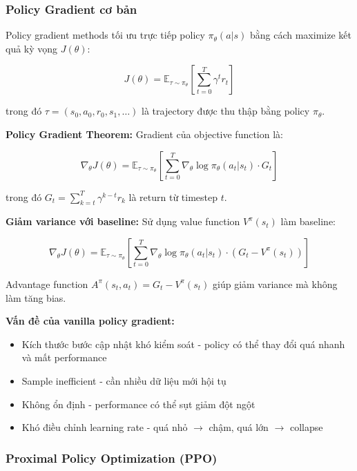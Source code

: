 \subsubsection{Policy Gradient cơ bản}

Policy gradient methods tối ưu trực tiếp policy $\pi_\theta(a|s)$ bằng cách maximize kết quả kỳ vọng $J(\theta)$:

\begin{equation}
J(\theta) = \mathbb{E}_{\tau \sim \pi_\theta} \left[ \sum_{t=0}^T \gamma^t r_t \right]
\end{equation}

trong đó $\tau = (s_0, a_0, r_0, s_1, \ldots)$ là trajectory được thu thập bằng policy $\pi_\theta$.

\textbf{Policy Gradient Theorem:} Gradient của objective function là:

\begin{equation}
\nabla_\theta J(\theta) = \mathbb{E}_{\tau \sim \pi_\theta} \left[ \sum_{t=0}^T \nabla_\theta \log \pi_\theta(a_t|s_t) \cdot G_t \right]
\end{equation}

trong đó $G_t = \sum_{k=t}^T \gamma^{k-t} r_k$ là return từ timestep $t$.

\textbf{Giảm variance với baseline:} Sử dụng value function $V^\pi(s_t)$ làm baseline:

\begin{equation}
\nabla_\theta J(\theta) = \mathbb{E}_{\tau \sim \pi_\theta} \left[ \sum_{t=0}^T \nabla_\theta \log \pi_\theta(a_t|s_t) \cdot (G_t - V^\pi(s_t)) \right]
\end{equation}

Advantage function $A^\pi(s_t, a_t) = G_t - V^\pi(s_t)$ giúp giảm variance mà không làm tăng bias.

\textbf{Vấn đề của vanilla policy gradient:}
\begin{itemize}
\item Kích thước bước cập nhật khó kiểm soát - policy có thể thay đổi quá nhanh và mất performance
\item Sample inefficient - cần nhiều dữ liệu mới hội tụ
\item Không ổn định - performance có thể sụt giảm đột ngột
\item Khó điều chỉnh learning rate - quá nhỏ $\rightarrow$ chậm, quá lớn $\rightarrow$ collapse
\end{itemize}

\subsubsection{Proximal Policy Optimization (PPO)}

